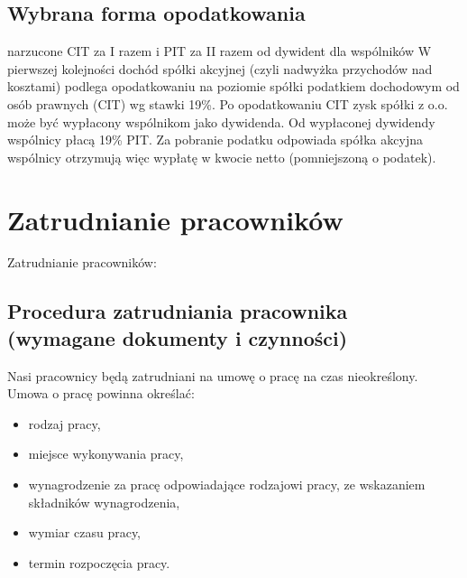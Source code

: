 \documentclass[a4paper, 11pt]{article}
\begin{document}
\subsection{Wybrana forma opodatkowania}

narzucone CIT  za I razem i PIT za II razem od dywident dla wspólników 
W pierwszej kolejności dochód spółki akcyjnej (czyli nadwyżka przychodów nad kosztami) podlega opodatkowaniu na poziomie spółki podatkiem dochodowym od osób prawnych (CIT) wg stawki 19\%. Po opodatkowaniu CIT zysk spółki z o.o. może być wypłacony wspólnikom jako dywidenda. Od wypłaconej dywidendy wspólnicy płacą 19\% PIT. Za pobranie podatku odpowiada spółka akcyjna wspólnicy otrzymują więc wypłatę w kwocie netto (pomniejszoną o podatek).
\section{Zatrudnianie pracowników}
Zatrudnianie pracowników:
\subsection{Procedura zatrudniania pracownika (wymagane dokumenty i czynności)}

Nasi pracownicy będą zatrudniani na umowę o pracę na czas nieokreślony.\\
Umowa o pracę powinna określać:
\begin{itemize}
\item rodzaj pracy,
\item miejsce wykonywania pracy,
\item wynagrodzenie za pracę odpowiadające rodzajowi pracy, ze wskazaniem składników wynagrodzenia,
\item wymiar czasu pracy,
\item termin rozpoczęcia pracy.
\end{itemize}
\end{document}
